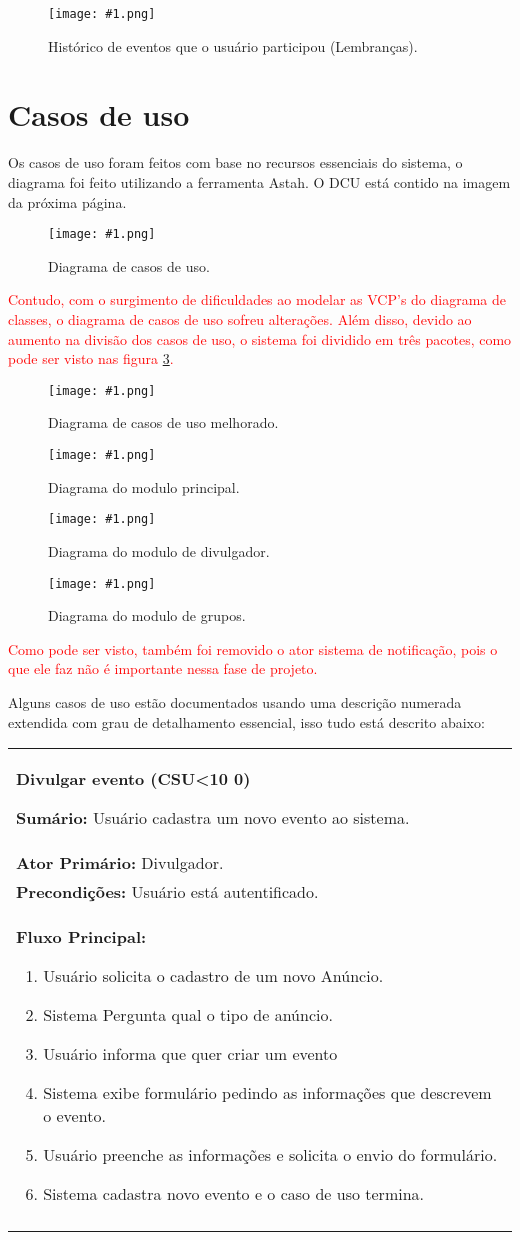\documentclass{article}
\newcounter{cscounter}
\newcommand{\sumario}[1] {\textbf{Sumário:} #1\\ }
\newcommand{\ator}[1] {\textbf{Ator Primário:} #1\\}
\newcommand{\precond}[1] {\textbf{Precondições:} #1\\}
\newcommand{\fluxo}{\textbf{Fluxo Principal:}}
\newcommand{\diagrama}[2]
{
 \begin{figure}[H]
 \begin{center}
 \texttt{[image: \#1.png]}
 \end{center}
 \caption{#2}
 \label{fig:#1}
 \end{figure}
}
\newcommand{\telasmart}[2]
{
 \begin{figure}[H]
 \begin{center}
 \texttt{[image: \#1.png]}
 \end{center}
 \caption{#2}
 \label{fig:#1}
 \end{figure}
}
\newenvironment{casosdeuso}[1]
{
 \stepcounter{cscounter}
 \begin{center}
 \begin{tabular}{|p{\textwidth}|}
 \hline
 \begin{center}
 \large \textbf{#1 (CSU\ifnum\value{cscounter}<10 0\fi\arabic{cscounter})}
 \end{center}
}
{ 
 \\\\\hline
 \end{tabular} 
 \end{center}
}
\begin{document}
\telasmart{hist_eventos}{Histórico de eventos que o usuário participou (Lembranças).}
 
\section{Casos de uso} \bigskip

Os casos de uso foram feitos com base no recursos essenciais do sistema, o diagrama foi feito utilizando a ferramenta Astah. O DCU está contido na imagem da próxima página.

\diagrama{usecase}{Diagrama de casos de uso.}
\pagebreak

\textcolor{red}{
	Contudo, com o surgimento de dificuldades ao modelar as VCP's do diagrama de classes, o diagrama de casos de uso sofreu alterações. Além disso, devido ao aumento na divisão dos casos de uso, o sistema foi dividido em três pacotes, como pode ser visto nas figura \ref{fig:usecase2}.
}
	\diagrama{usecase2}{Diagrama de casos de uso melhorado.}
	\diagrama{usecase21}{Diagrama do modulo principal.}
	\diagrama{usecase22}{Diagrama do modulo de divulgador.}
	\diagrama{usecase23}{Diagrama do modulo de grupos.}
	
\textcolor{red}{
	Como pode ser visto, também foi removido o ator sistema de notificação, pois o que ele faz não é importante nessa fase de projeto.
}

Alguns casos de uso estão documentados usando uma descrição numerada extendida com grau de detalhamento essencial, isso tudo está descrito abaixo: 

\begin{casosdeuso}{Divulgar evento}
 \sumario{Usuário cadastra um novo evento ao sistema.}
 \ator{Divulgador.}
 \precond{Usuário está autentificado.}
\fluxo
\begin{enumerate}[itemsep=0mm]
 \item Usuário solicita o cadastro de um novo Anúncio.
 \item Sistema Pergunta qual o tipo de anúncio.
 \item Usuário informa que quer criar um evento
 \item Sistema exibe formulário pedindo as informações que descrevem o evento.
 \item Usuário preenche as informações e solicita o envio do formulário.
 \item Sistema cadastra novo evento e o caso de uso termina.
\end{enumerate}
\end{casosdeuso}
\end{document}
